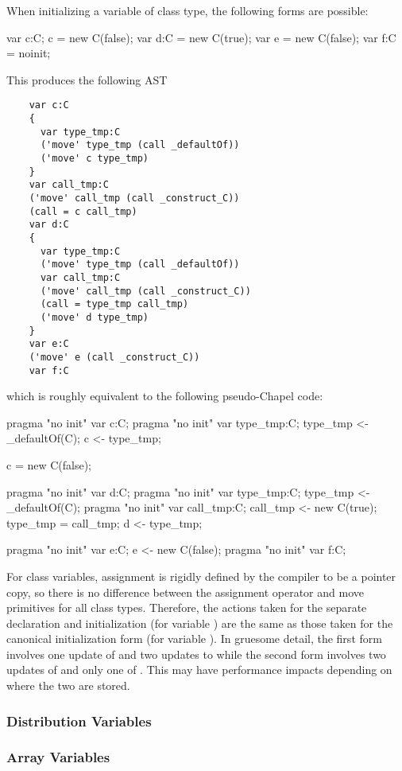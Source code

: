 When initializing a variable of class type, the following forms are possible:
\begin{chapel}
  var c:C; c = new C(false);
  var d:C = new C(true);
  var e = new C(false);
  var f:C = noinit;
\end{chapel}
This produces the following AST
\begin{verbatim}
    var c:C
    {
      var type_tmp:C
      ('move' type_tmp (call _defaultOf))
      ('move' c type_tmp)
    }
    var call_tmp:C
    ('move' call_tmp (call _construct_C))
    (call = c call_tmp)
    var d:C
    {
      var type_tmp:C
      ('move' type_tmp (call _defaultOf))
      var call_tmp:C
      ('move' call_tmp (call _construct_C))
      (call = type_tmp call_tmp)
      ('move' d type_tmp)
    }
    var e:C
    ('move' e (call _construct_C))
    var f:C
\end{verbatim}
which is roughly equivalent to the following pseudo-Chapel code:
\begin{chapel}
  pragma "no init" var c:C;
  pragma "no init" var type_tmp:C; type_tmp <- _defaultOf(C);
  c <- type_tmp;

  c = new C(false);

  pragma "no init" var d:C; 
  pragma "no init" var type_tmp:C; type_tmp <- _defaultOf(C);
  pragma "no init" var call_tmp:C; call_tmp <- new C(true);
  type_tmp = call_tmp;
  d <- type_tmp;

  pragma "no init" var e:C; e <- new C(false);
  pragma "no init" var f:C;
\end{chapel}

For class variables, assignment is rigidly defined by the compiler to be a pointer copy,
so there is no difference between the assignment operator and move primitives for all
class types.  Therefore, the actions taken for the separate declaration and initialization
(for variable ) are the same as those taken for the canonical initialization form
(for variable ).  In gruesome detail, the first form involves one update of
 and two updates to  while the second form involves two updates of
 and only one of .  This may have performance impacts depending on
where the two are stored.


\subsubsection{Distribution Variables}

\subsubsection{Array Variables}

